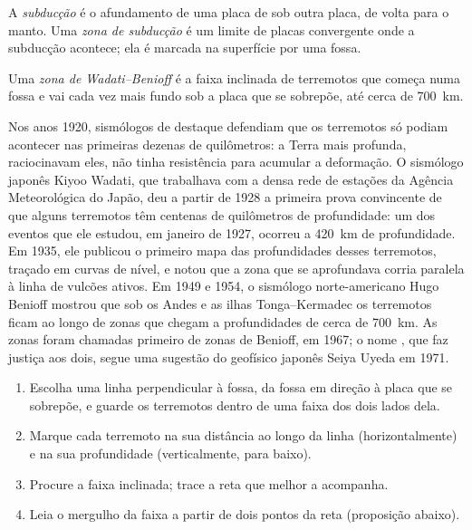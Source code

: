 \begin{definition}\label{def:g11:subduction-zones:subduction}
A \emph{subducção} é o afundamento de uma placa de
 sob outra placa, de volta para o manto. Uma \emph{zona de
subducção} é um limite de placas
convergente onde a subducção acontece; ela é marcada na superfície por uma
fossa.
\end{definition}

\begin{definition}\label{def:g11:subduction-zones:benioff}
Uma \emph{zona de Wadati--Benioff} é a faixa
inclinada de terremotos que começa numa fossa e vai cada vez mais fundo sob
a placa que se sobrepõe, até cerca de \qty{700}{km}.
\end{definition}

\begin{history}
Nos anos 1920, sismólogos de destaque defendiam que os terremotos só podiam
acontecer nas primeiras dezenas de quilômetros: a Terra mais profunda,
raciocinavam eles, não tinha resistência para acumular a deformação. O
sismólogo japonês Kiyoo Wadati, que trabalhava com a densa rede de estações
da Agência Meteorológica do Japão, deu a partir de 1928 a primeira prova
convincente de que alguns terremotos têm centenas de quilômetros de
profundidade: um dos eventos que ele estudou, em janeiro de 1927, ocorreu a
\qty{420}{km} de profundidade. Em 1935, ele publicou o primeiro mapa das
profundidades desses terremotos, traçado em curvas de nível, e notou que a
zona que se aprofundava corria paralela à linha de vulcões ativos. Em 1949 e
1954, o sismólogo norte-americano Hugo Benioff mostrou que sob os Andes e
as ilhas Tonga--Kermadec os terremotos ficam ao longo de zonas que chegam a
profundidades de cerca de \qty{700}{km}. As zonas foram chamadas primeiro de
zonas de Benioff, em 1967; o nome , que faz justiça
aos dois, segue uma sugestão do geofísico japonês Seiya Uyeda em 1971.
\end{history}

\begin{method}\label{met:g11:subduction-zones:section}
\begin{enumerate}
  \item Escolha uma linha perpendicular à fossa, da fossa em direção à placa
        que se sobrepõe, e guarde os terremotos dentro de uma faixa dos dois
        lados dela.
  \item Marque cada terremoto na sua distância ao longo da linha
        (horizontalmente) e na sua profundidade (verticalmente, para baixo).
  \item Procure a faixa inclinada; trace a reta que melhor a acompanha.
  \item Leia o mergulho da faixa a partir de dois pontos da reta
        (proposição abaixo).
\end{enumerate}
\end{method}

